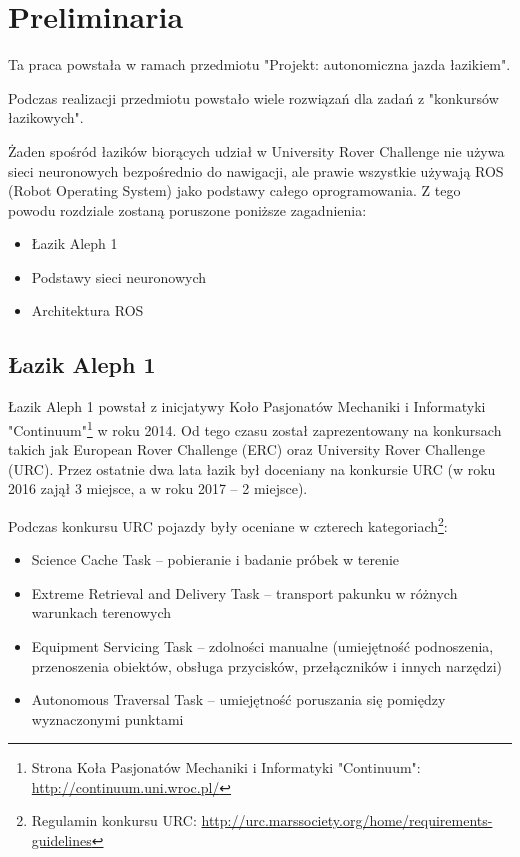 \chapter{Preliminaria}
Ta praca 
powstała w ramach przedmiotu "Projekt: autonomiczna jazda łazikiem".

Podczas realizacji przedmiotu powstało wiele rozwiązań dla zadań z 
"konkursów łazikowych".

Żaden spośród łazików biorących udział w University Rover Challenge nie 
używa sieci neuronowych bezpośrednio do nawigacji, ale prawie wszystkie używają
ROS (Robot Operating System) jako podstawy całego oprogramowania. Z tego powodu
rozdziale zostaną poruszone poniższe zagadnienia:
\begin{itemize}
  \item Łazik Aleph 1
  \item Podstawy sieci neuronowych
  \item Architektura ROS
\end{itemize}
\section {Łazik Aleph 1}
Łazik Aleph 1 powstał z inicjatywy 
Koło Pasjonatów Mechaniki i Informatyki "Continuum"\footnote{ Strona Koła Pasjonatów Mechaniki i Informatyki "Continuum":
\href{http://continuum.uni.wroc.pl/}{http://continuum.uni.wroc.pl/}}
w roku 2014. Od tego czasu został zaprezentowany na konkursach takich jak 
European Rover Challenge (ERC) oraz University Rover Challenge (URC). Przez ostatnie
dwa lata łazik był doceniany na konkursie URC (w roku 2016 zajął 3 miejsce, a w roku
2017 -- 2 miejsce).

Podczas konkursu URC pojazdy były oceniane w czterech kategoriach\footnote{
Regulamin konkursu URC: \href{http://urc.marssociety.org/home/requirements-guidelines}
{http://urc.marssociety.org/home/requirements-guidelines}}:
\begin{itemize}
  \item Science Cache Task -- pobieranie i badanie próbek w terenie 
  \item Extreme Retrieval and Delivery Task -- transport pakunku w różnych warunkach
    terenowych
  \item Equipment Servicing Task -- zdolności manualne (umiejętność podnoszenia,
    przenoszenia obiektów, obsługa przycisków, przełączników i innych narzędzi)
  \item Autonomous Traversal Task -- umiejętność poruszania się pomiędzy wyznaczonymi
    punktami
\end{itemize}


